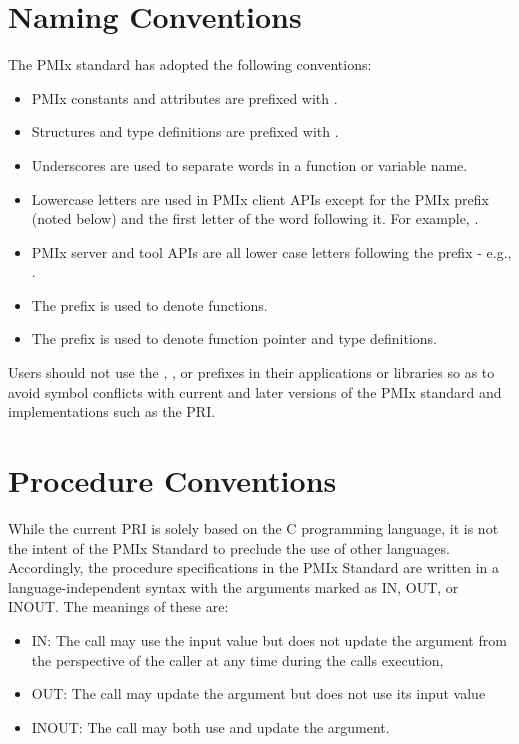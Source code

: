 \section{Naming Conventions}

The \ac{PMIx} standard has adopted the following conventions:

\begin{itemize}
\item \ac{PMIx} constants and attributes are prefixed with \textbf{}.
\item Structures and type definitions are prefixed with .
\item Underscores are used to separate words in a function or variable name.
\item Lowercase letters are used in \ac{PMIx} client \acp{API} except for the \ac{PMIx} prefix (noted below) and the first letter of the word following it.
For example, .
\item \ac{PMIx} server and tool \acp{API} are all lower case letters following the prefix - e.g., .
\item The  prefix is used to denote functions.
\item The  prefix is used to denote function pointer and type definitions.
\end{itemize}

Users should not use the \textbf{}, \textbf{}, or \textbf{} prefixes in their applications or libraries so as to avoid symbol conflicts with current and later versions of the \ac{PMIx} standard and implementations such as the \ac{PRI}.

\section{Procedure Conventions}

While the current \acf{PRI} is solely based on the C programming language, it is not the intent of the \ac{PMIx} Standard to preclude the use of other languages.
Accordingly, the procedure specifications in the \ac{PMIx} Standard are written in a language-independent syntax with the arguments marked as IN, OUT, or INOUT.
The meanings of these are:
\begin{itemize}
\item IN:
The call may use the input value but does not update the argument from the perspective of the caller at any time during the calls execution,
\item OUT:
The call may update the argument but does not use its input value
\item INOUT:
The call may both use and update the argument.
\end{itemize}

